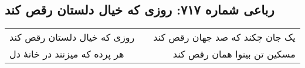 \begin{center}
\section*{رباعی شماره ۷۱۷: روزی که خیال دلستان رقص کند}
\label{sec:0717}
\begin{longtable}{l p{0.5cm} r}
روزی که خیال دلستان رقص کند
&&
یک جان چکند که صد جهان رقص کند
\\
هر پرده که میزنند در خانهٔ دل
&&
مسکین تن بینوا همان رقص کند
\\
\end{longtable}
\end{center}
